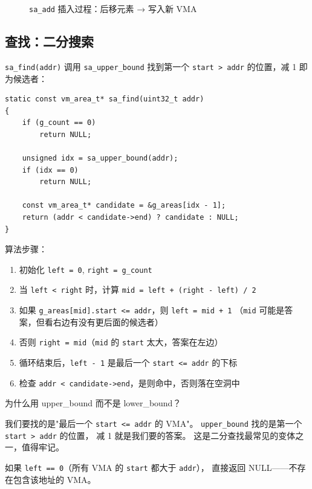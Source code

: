 \begin{figure}[H]
  \centering
  
  \caption{\texttt{sa\_add} 插入过程：后移元素 → 写入新 VMA}
  \label{fig:vma-sa-insert}
\end{figure}

\subsection{查找：二分搜索}

\texttt{sa\_find(addr)} 调用 \texttt{sa\_upper\_bound} 找到第一个 \texttt{start > addr}
的位置，减 1 即为候选者：

\begin{lstlisting}[style=cstyle]
static const vm_area_t* sa_find(uint32_t addr)
{
    if (g_count == 0)
        return NULL;

    unsigned idx = sa_upper_bound(addr);
    if (idx == 0)
        return NULL;

    const vm_area_t* candidate = &g_areas[idx - 1];
    return (addr < candidate->end) ? candidate : NULL;
}
\end{lstlisting}

算法步骤：

\begin{enumerate}
  \item 初始化 \texttt{left = 0}, \texttt{right = g\_count}
  \item 当 \texttt{left < right} 时，计算 \texttt{mid = left + (right - left) / 2}
  \item 如果 \texttt{g\_areas[mid].start <= addr}，则 \texttt{left = mid + 1}
        （\texttt{mid} 可能是答案，但看右边有没有更后面的候选者）
  \item 否则 \texttt{right = mid}（\texttt{mid} 的 \texttt{start} 太大，答案在左边）
  \item 循环结束后，\texttt{left - 1} 是最后一个 \texttt{start <= addr} 的下标
  \item 检查 \texttt{addr < candidate->end}，是则命中，否则落在空洞中
\end{enumerate}

\begin{whybox}
为什么用 upper\_bound 而不是 lower\_bound？

我们要找的是"最后一个 \texttt{start <= addr} 的 VMA"。
\texttt{upper\_bound} 找的是第一个 \texttt{start > addr} 的位置，
减 1 就是我们要的答案。
这是二分查找最常见的变体之一，值得牢记。

如果 \texttt{left == 0}（所有 VMA 的 \texttt{start} 都大于 \texttt{addr}），
直接返回 NULL——不存在包含该地址的 VMA。
\end{whybox}

